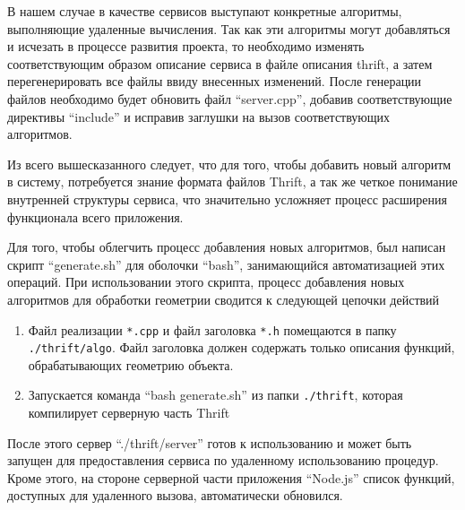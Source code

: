 \documentclass[14pt, a4paper]{extarticle}
\begin{document}
В нашем случае в качестве сервисов выступают конкретные алгоритмы, выполняющие
удаленные вычисления. Так как эти алгоритмы могут добавляться и исчезать в
процессе развития проекта, то необходимо изменять соответствующим образом
описание сервиса в файле описания thrift, а затем перегенерировать все файлы
ввиду внесенных изменений. После генерации файлов необходимо будет обновить
файл ``server.cpp'', добавив соответствующие директивы ``include'' и исправив
заглушки на вызов соответствующих алгоритмов.

Из всего вышесказанного следует, что для того, чтобы добавить новый алгоритм в
систему, потребуется знание
формата файлов Thrift, а так же четкое понимание внутренней структуры сервиса,
что значительно усложняет процесс расширения функционала всего приложения.

Для того, чтобы облегчить процесс добавления новых алгоритмов, был написан
скрипт ``generate.sh'' для оболочки ``bash'', занимающийся автоматизацией этих
операций. При использовании этого скрипта, процесс добавления новых алгоритмов
для обработки геометрии сводится к следующей цепочки действий
\begin{enumerate}
    \item Файл реализации \texttt{*.cpp} и файл заголовка \texttt{*.h}
    помещаются в папку \texttt{./thrift/algo}. Файл заголовка должен содержать
    только описания функций, обрабатывающих геометрию объекта.
    \item Запускается команда ``bash generate.sh'' из папки \texttt{./thrift},
    которая компилирует серверную часть Thrift
\end{enumerate}

После этого сервер ``./thrift/server'' готов к использованию и может быть
запущен для предоставления сервиса по удаленному использованию процедур. Кроме
этого, на стороне серверной части приложения ``Node.js'' список функций,
доступных для удаленного вызова, автоматически обновился.
\end{document}

